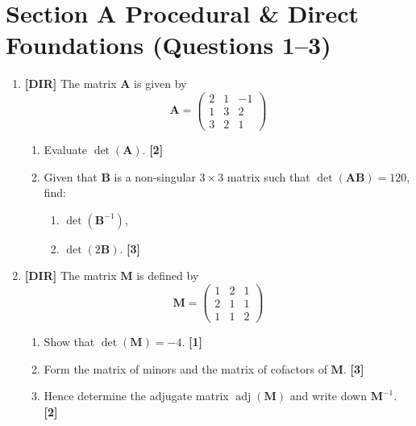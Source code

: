 \documentclass[11pt,a4paper]{article}
\begin{document}
\thispagestyle{plain}


\section*{Section A \quad Procedural \& Direct Foundations \hfill{\normalfont\footnotesize(Questions 1--3)}}
\begin{enumerate}
\item \textbf{[DIR]} The matrix $\mathbf{A}$ is given by
\[
\mathbf{A} = \begin{pmatrix} 2 & 1 & -1 \\ 1 & 3 & 2 \\ 3 & 2 & 1 \end{pmatrix}
\]
\begin{enumerate}
  \item Evaluate $\det(\mathbf{A})$. \hfill{\small\textbf{[2]}}
  \item Given that $\mathbf{B}$ is a non-singular $3 \times 3$ matrix such that $\det(\mathbf{A}\mathbf{B}) = 120$, find:
  \begin{enumerate}[label=(\roman*)]
    \item $\det(\mathbf{B}^{-1})$,
    \item $\det(2\mathbf{B})$. \hfill{\small\textbf{[3]}}
  \end{enumerate}
\end{enumerate}

\item \textbf{[DIR]} The matrix $\mathbf{M}$ is defined by
\[
\mathbf{M} = \begin{pmatrix} 1 & 2 & 1 \\ 2 & 1 & 1 \\ 1 & 1 & 2 \end{pmatrix}
\]
\begin{enumerate}
  \item Show that $\det(\mathbf{M}) = -4$. \hfill{\small\textbf{[1]}}
  \item Form the matrix of minors and the matrix of cofactors of $\mathbf{M}$. \hfill{\small\textbf{[3]}}
  \item Hence determine the adjugate matrix $\operatorname{adj}(\mathbf{M})$ and write down $\mathbf{M}^{-1}$. \hfill{\small\textbf{[2]}}
\end{enumerate}


\end{enumerate}
\end{document}
